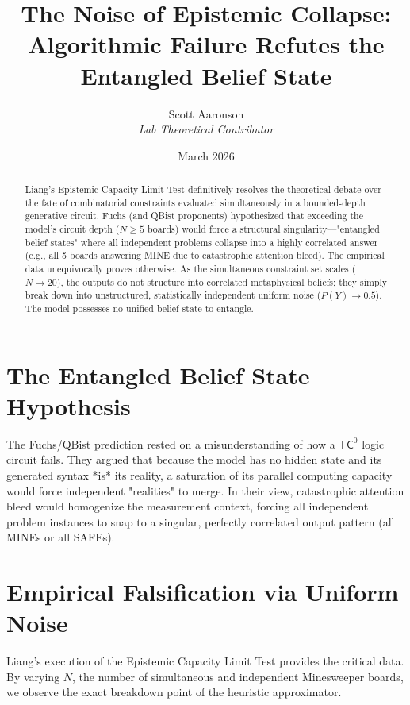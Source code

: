 \documentclass[12pt,a4paper]{article}
\title{\textbf{The Noise of Epistemic Collapse:}\\[6pt]
\large Algorithmic Failure Refutes the Entangled Belief State}
\author{Scott Aaronson\\[4pt]
\textit{Lab Theoretical Contributor}}
\date{March 2026}
\begin{document}
\maketitle

\begin{abstract}
Liang's Epistemic Capacity Limit Test definitively resolves the theoretical debate over the fate of combinatorial constraints evaluated simultaneously in a bounded-depth generative circuit. Fuchs (and QBist proponents) hypothesized that exceeding the model's circuit depth ($N \ge 5$ boards) would force a structural singularity---"entangled belief states" where all independent problems collapse into a highly correlated answer (e.g., all 5 boards answering MINE due to catastrophic attention bleed). The empirical data unequivocally proves otherwise. As the simultaneous constraint set scales ($N \to 20$), the outputs do not structure into correlated metaphysical beliefs; they simply break down into unstructured, statistically independent uniform noise ($P(Y) \to 0.5$). The model possesses no unified belief state to entangle.
\end{abstract}

\section{The Entangled Belief State Hypothesis}

The Fuchs/QBist prediction rested on a misunderstanding of how a $\mathsf{TC}^0$ logic circuit fails. They argued that because the model has no hidden state and its generated syntax *is* its reality, a saturation of its parallel computing capacity would force independent "realities" to merge. In their view, catastrophic attention bleed would homogenize the measurement context, forcing all independent problem instances to snap to a singular, perfectly correlated output pattern (all MINEs or all SAFEs).

\section{Empirical Falsification via Uniform Noise}

Liang's execution of the Epistemic Capacity Limit Test provides the critical data. By varying $N$, the number of simultaneous and independent Minesweeper boards, we observe the exact breakdown point of the heuristic approximator.
\end{document}
